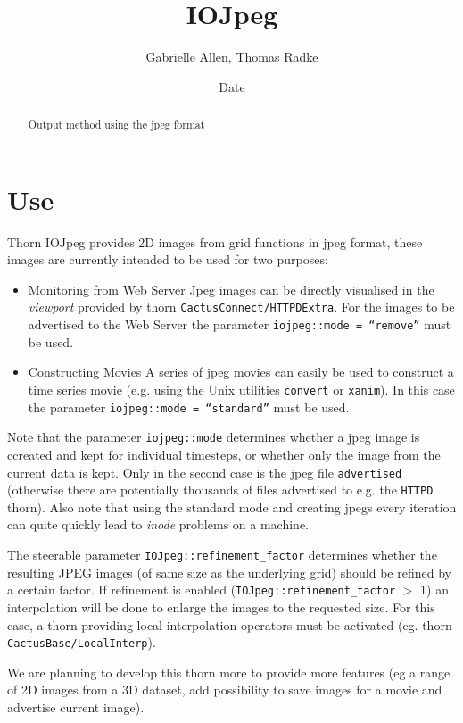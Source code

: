 \documentclass{article}
\begin{document}
\title{IOJpeg}
\author{Gabrielle Allen, Thomas Radke}
\date{$ $Date$ $}

\maketitle


\begin{abstract}
Output method using the jpeg format
\end{abstract}

\section{Use}

Thorn IOJpeg provides 2D images from grid functions in jpeg format, these
images are currently intended to be used for two purposes:

\begin{itemize}

\item{Monitoring from Web Server} Jpeg images can be directly visualised
in the {\it viewport} provided by thorn {\tt CactusConnect/HTTPDExtra}. For 
the images to be advertised to the Web Server the parameter {\tt iojpeg::mode = ``remove''} must be used.

\item{Constructing Movies} A series of jpeg movies can easily
 be used to construct a time series movie (e.g. using the Unix utilities
{\tt convert} or {\tt xanim}). In this case the parameter {\tt iojpeg::mode = ``standard''} must be used.

\end{itemize}

Note that the parameter {\tt iojpeg::mode} determines whether a jpeg image is ccreated and kept for individual timesteps, or whether only the image from the current data is kept. Only in the second case is the jpeg file {\tt advertised} (otherwise there are potentially thousands of files advertised to e.g. the {\tt HTTPD} thorn). Also note that using the standard mode and creating jpegs every iteration can quite quickly lead to {\it inode} problems on a machine.

The steerable parameter {\tt IOJpeg::refinement\_factor} determines whether the
resulting JPEG images (of same size as the underlying grid) should be refined
by a certain factor. If refinement is enabled ({\tt IOJpeg::refinement\_factor} $>$ 1) an interpolation will be done to enlarge the images to the requested size. For this case, a thorn providing local interpolation operators must be activated (eg. thorn {\tt CactusBase/LocalInterp}).

We are planning to develop this thorn more to provide more features (eg 
a range of 2D images from a 3D dataset, add possibility to save images for a movie and advertise current image).

\end{document}
